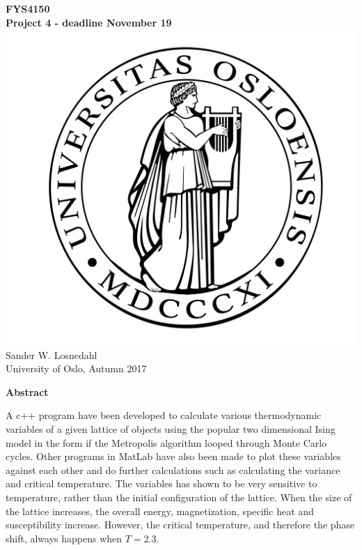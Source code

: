 \documentclass[10pt,a4paper]{article}
\begin{document}
\begin{center}
{\LARGE\bf
FYS4150\\

Project 4 - deadline November 19
}
\\
 \includegraphics[scale=0.1]{uio.png}\\
Sander W. Losnedahl\\
University of Oslo, Autumn 2017
 
\end{center}

\begin{center}
{\Large\bf Abstract}
\end{center}

\noindent A c++ program have been developed to calculate various thermodynamic variables of a given lattice of objects using the popular two dimensional Ising model in the form if the Metropolis algorithm looped through Monte Carlo cycles. Other programs in MatLab have also been made to plot these variables against each other and do further calculations such as calculating the variance and critical temperature. The variables has shown to be very sensitive to temperature, rather than the initial configuration of the lattice. When the size of the lattice increases, the overall energy, magnetization, specific heat and susceptibility increase. However, the critical temperature, and therefore the phase shift, always happens when $T = 2.3$.
\end{document}
